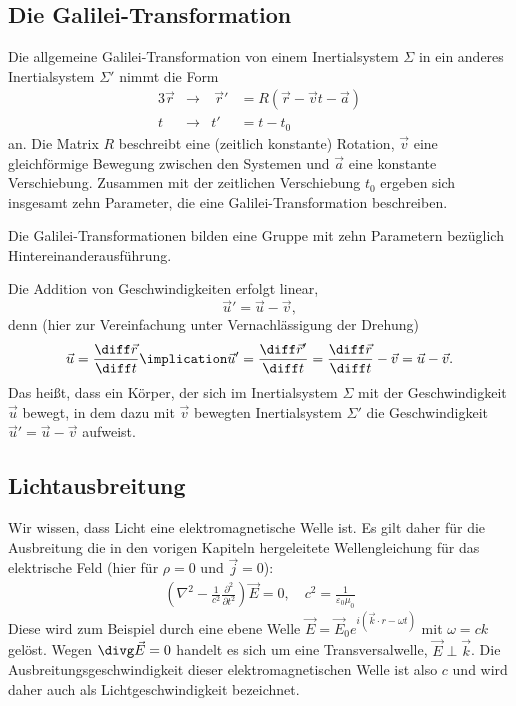 \subsection{Die Galilei-Transformation}

Die allgemeine Galilei-Transformation von einem Inertialsystem $\Sigma$ in ein anderes Inertialsystem $\Sigma'$ nimmt die Form
\begin{alignat*}{3}
    \vec r & \rightarrow & \:\vec r' & = R(\vec r-\vec vt-\vec a) \\
    t      & \rightarrow & t'        & =t-t_0
\end{alignat*}
an. Die Matrix $R$ beschreibt eine (zeitlich konstante) Rotation, $\vec v$ eine gleichförmige Bewegung zwischen den Systemen und $\vec a$ eine konstante Verschiebung. Zusammen mit der zeitlichen Verschiebung $t_0$ ergeben sich insgesamt zehn Parameter, die eine Galilei-Transformation beschreiben.

\begin{formal}
    Die Galilei-Transformationen bilden eine Gruppe mit zehn Parametern bezüglich Hintereinanderausführung.
\end{formal}


Die Addition von Geschwindigkeiten erfolgt linear,
\begin{equation*}
    \vec u' = \vec u - \vec v,
\end{equation*}
denn (hier zur Vereinfachung unter Vernachlässigung der Drehung)
\begin{align*}
    \vec u = \frac{\diff\vec r}{\diff t} \implication \vec u' = \frac{\diff\vec r'}{\diff t} = \frac{\diff\vec r}{\diff t}-\vec v= \vec u - \vec v.
\end{align*}
Das heißt, dass ein Körper, der sich im Inertialsystem $\Sigma$ mit der Geschwindigkeit $\vec u$ bewegt, in dem dazu mit $\vec v$ bewegten Inertialsystem $\Sigma'$ die Geschwindigkeit $\vec u'=\vec u-\vec v$ aufweist.


\subsection{Lichtausbreitung}

Wir wissen, dass Licht eine elektromagnetische Welle ist. Es gilt daher für die Ausbreitung die in den vorigen Kapiteln hergeleitete Wellengleichung für das elektrische Feld (hier für $\rho=0$ und $\vec j=0$):
\begin{align}
    \label{eq:wellengleichung_e}
    \left(\nabla^2-\frac{1}{c^2}\frac{\partial^2}{\partial t^2}\right) \vec E=0, \quad c^2=\frac{1}{\varepsilon_0\mu_0}
\end{align}
Diese wird zum Beispiel durch eine ebene Welle $\vec E=\vec E_0 e^{i(\vec k\cdot r-\omega t)}$ mit $\omega=ck$ gelöst. Wegen $\divg \vec E =0$ handelt es sich um eine Transversalwelle, $\vec E\perp \vec k$. Die Ausbreitungsgeschwindigkeit dieser elektromagnetischen Welle ist also $c$ und wird daher auch als Lichtgeschwindigkeit bezeichnet.

